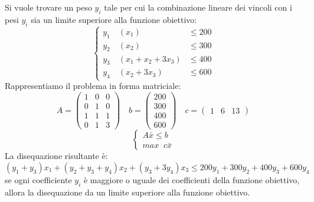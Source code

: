 \documentclass[a4paper]{article}
\begin{document}
\begin{example}
  \vspace{1em}
  \noindent
  Si vuole trovare un peso \( y_i \) tale per cui la combinazione lineare dei vincoli
  con i pesi \( y_i \) sia un limite superiore alla funzione obiettivo:
  \[
    \begin{cases}
     y_1 \quad (x_1)               & \le 200\\
     y_2 \quad (x_2)               & \le 300\\
     y_3 \quad (x_1 + x_2 + 3 x_3) & \le 400\\
     y_4 \quad (x_2 + 3x_3)        & \le 600
    \end{cases}
  \] 
  Rappresentiamo il problema in forma matriciale:
  \[
  A = \begin{pmatrix} 
    1 & 0 & 0 \\
    0 & 1 & 0 \\
    1 & 1 & 1 \\
    0 & 1 & 3
  \end{pmatrix} 
  \quad
  b = \begin{pmatrix} 
    200 \\ 300 \\ 400 \\ 600
  \end{pmatrix} 
  \quad
  c = \begin{pmatrix} 
    1 & 6 & 13
  \end{pmatrix}
  \] 
  \[
    \begin{cases}
      A \bar{x} \le b\\
      max \;\; c \bar{x}
    \end{cases}
  \] 
  La disequazione risultante è:
  \[
    (y_1 + y_3) x_1 + (y_2 + y_3 + y_4) x_2 + (y_3 + 3y_4) x_3
    \le 200 y_1 + 300 y_2 + 400 y_3 + 600 y_4
  \] 
  se ogni coefficiente \( y_i \) è maggiore o uguale dei coefficienti della funzione
  obiettivo, allora la disequazione da un limite superiore alla funzione obiettivo.


\end{example}
\end{document}
